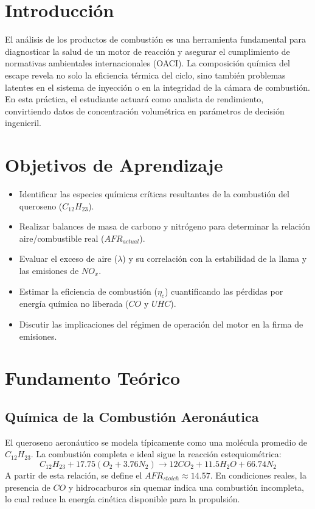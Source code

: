 \documentclass[11pt, a4paper]{article}
\begin{document}
\section{Introducción}
El análisis de los productos de combustión es una herramienta fundamental para diagnosticar la salud de un motor de reacción y asegurar el cumplimiento de normativas ambientales internacionales (OACI). La composición química del escape revela no solo la eficiencia térmica del ciclo, sino también problemas latentes en el sistema de inyección o en la integridad de la cámara de combustión. En esta práctica, el estudiante actuará como analista de rendimiento, convirtiendo datos de concentración volumétrica en parámetros de decisión ingenieril.

\section{Objetivos de Aprendizaje}
\begin{itemize}[label=-]
    \item Identificar las especies químicas críticas resultantes de la combustión del queroseno ($C_{12}H_{23}$).
    \item Realizar balances de masa de carbono y nitrógeno para determinar la relación aire/combustible real ($AFR_{actual}$).
    \item Evaluar el exceso de aire ($\lambda$) y su correlación con la estabilidad de la llama y las emisiones de $NO_x$.
    \item Estimar la eficiencia de combustión ($\eta_c$) cuantificando las pérdidas por energía química no liberada ($CO$ y $UHC$).
    \item Discutir las implicaciones del régimen de operación del motor en la firma de emisiones.
\end{itemize}

\section{Fundamento Teórico}

\subsection{Química de la Combustión Aeronáutica}
El queroseno aeronáutico se modela típicamente como una molécula promedio de $C_{12}H_{23}$. La combustión completa e ideal sigue la reacción estequiométrica:
\begin{equation}
    C_{12}H_{23} + 17.75(O_2 + 3.76N_2) \rightarrow 12CO_2 + 11.5H_2O + 66.74N_2
\end{equation}
A partir de esta relación, se define el $AFR_{stoich} \approx 14.57$. En condiciones reales, la presencia de $CO$ y hidrocarburos sin quemar indica una combustión incompleta, lo cual reduce la energía cinética disponible para la propulsión.
\end{document}
